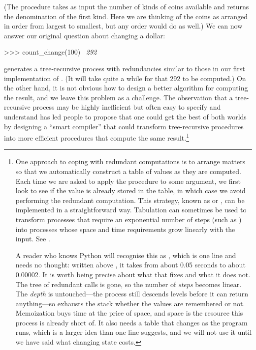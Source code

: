 \noindent
(The  procedure takes as input the number of kinds of
coins available and returns the denomination of the first kind.  Here we are
thinking of the coins as arranged in order from largest to smallest, but any
order would do as well.)  We can now answer our original question about
changing a dollar:

\begin{codeBlock}
>>> count_change(100)
~\textit{292}~
\end{codeBlock}

\noindent
{} generates a tree-recursive process with redundancies
similar to those in our first implementation of .  (It will take
quite a while for that 292 to be computed.)  On the other hand, it is not
obvious how to design a better algorithm for computing the result, and we leave
this problem as a challenge.  The observation that a tree-recursive process may
be highly inefficient but often easy to specify and understand has led people
to propose that one could get the best of both worlds by designing a ``smart
compiler'' that could transform tree-recursive procedures into more efficient
procedures that compute the same result.\footnote{One approach to coping with
redundant computations is to arrange matters so that we automatically construct
a table of values as they are computed.  Each time we are asked to apply the
procedure to some argument, we first look to see if the value is already stored
in the table, in which case we avoid performing the redundant computation.
This strategy, known as  or , can be
implemented in a straightforward way.  Tabulation can sometimes be used to
transform processes that require an exponential number of steps (such as
) into processes whose space and time requirements grow
linearly with the input.  See .

A reader who knows Python will recognise this as , which
is one line and needs no thought: written above , it takes
 from about 0.05 seconds to about 0.00002.  It is worth being
precise about what that fixes and what it does not.  The tree of redundant
calls is gone, so the number of \emph{steps} becomes linear.  The
\emph{depth} is untouched---the process still descends  levels before
it can return anything---so  exhausts the stack whether the
values are remembered or not.  Memoization buys time at the price of space,
and space is the resource this process is already short of.  It also needs a
table that changes as the program runs, which is a larger idea than one line
suggests, and we will not use it until we have said what changing state costs.}

